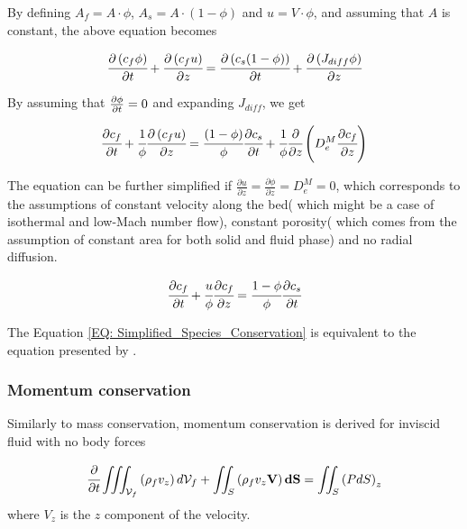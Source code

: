 \documentclass[../Article_Design_of_Experiment.tex]{subfiles}
\begin{document}
	By defining $A_f = A \cdot \phi$, $A_s = A \cdot \left( 1-\phi \right)$ and $u=V \cdot \phi$, and assuming that $A$ is constant, the above equation becomes
	
	{\footnotesize
		\begin{equation}
			\cfrac{\partial \left( c_f \phi \right)}{\partial t} + \cfrac{\partial \left( c_f u\right)}{\partial z} = \cfrac{\partial \left( c_s (1-\phi) \right) }{\partial t} + \cfrac{\partial \left( J_{diff} \phi \right) }{\partial z}
		\end{equation}
	}

	By assuming that ${\footnotesize \frac{\partial \phi}{\partial t}=0}$ and expanding $J_{diff}$, we get
	
	{\footnotesize
		\begin{equation}
			\cfrac{\partial c_f}{\partial t} + \cfrac{1}{\phi} \cfrac{\partial \left( c_f u\right)}{\partial z} = \cfrac{ (1-\phi)}{\phi} \cfrac{\partial c_s }{\partial t} + \cfrac{1}{\phi} \cfrac{\partial}{\partial z} \left( D_e^M \cfrac{\partial c_f}{\partial z} \right)
		\end{equation}
	}
	
	The equation can be further simplified if $\frac{\partial u}{\partial z} = \frac{\partial \phi}{\partial z} = D_e^M = 0$, which corresponds to the assumptions of constant velocity along the bed( which might be a case of isothermal and low-Mach number flow), constant porosity( which comes from the assumption of constant area for both solid and fluid phase) and no radial diffusion.
	
	{\footnotesize
		\begin{equation}
			\cfrac{\partial c_f}{\partial t} + \cfrac{u}{\phi} \cfrac{\partial c_f}{\partial z}  = \cfrac{1-\phi}{\phi} \cfrac{\partial c_s}{\partial t} 
			\label{EQ: Simplified_Species_Conservation}
		\end{equation}
	}

	The Equation \ref{EQ: Simplified_Species_Conservation} is equivalent to the equation presented by \citet{Reverchon1996}.
	
	\subsubsection{Momentum conservation}
	
	Similarly to mass conservation, momentum conservation is derived for inviscid fluid with no body forces
	
	{\footnotesize
		\begin{equation}
			\cfrac{\partial}{\partial t} \iiint_{\mathcal{V}_f} \left( \rho_f v_z \right) d\mathcal{V}_f + \iint_S \left( \rho_f v_z \textbf{V} \right) \textbf{dS} = \iint_S \left( P dS \right)_z
			\label{EQ: Momentum_Integral_Form}
		\end{equation}
	}
	where $V_z$ is the $z$ component of the velocity.
\end{document}
